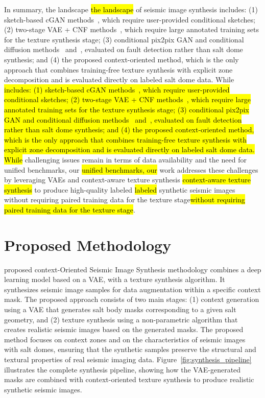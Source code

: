 \documentclass{ieeeaccess}
\makeatletter
\DeclareRobustCommand{\DIFaddbegin}{\DIFOaddbegin \let\includegraphics\DIFaddincludegraphics} %
\DeclareRobustCommand{\DIFaddend}{\DIFOaddend \let\includegraphics\DIFOincludegraphics} %
\DeclareRobustCommand{\DIFdelbegin}{\DIFOdelbegin \let\includegraphics\DIFdelincludegraphics} %
\DeclareRobustCommand{\DIFdelend}{\DIFOaddend \let\includegraphics\DIFOincludegraphics} %
\let\sout@orig\sout %
\renewcommand{\sout}[1]{\ifmmode\text{\sout@orig{\ensuremath{#1}}}\else\sout@orig{#1}\fi} %
\providecommand{\DIFadd}[1]{{\protect\color{blue}#1}}
\providecommand{\DIFdel}[1]{{\protect\color{red}\sout{#1}}}
\renewcommand{\DIFadd}[1]{\ifmmode#1\else\begingroup\let\protect\relax\hl{#1}\endgroup\fi}
\renewcommand{\DIFdel}[1]{}
\providecommand{\DIFaddbegin}{}
\providecommand{\DIFaddend}{}
\providecommand{\DIFdelbegin}{}
\providecommand{\DIFdelend}{}
\renewcommand{\DIFaddbegin}{}
\renewcommand{\DIFaddend}{}
\renewcommand{\DIFdelbegin}{}
\renewcommand{\DIFdelend}{}
\makeatother
\begin{document}
In summary, \DIFdelbegin \DIFdel{while there has been significant progress in the field }\DIFdelend \DIFaddbegin \DIFadd{the landscape }\DIFaddend of seismic image synthesis \DIFdelbegin \DIFdel{, some }\DIFdelend \DIFaddbegin \DIFadd{includes: (1) sketch-based cGAN methods~\cite{Ferreira2020}, which require user-provided conditional sketches; (2) two-stage VAE + CNF methods~\cite{Henriques2021}, which require large annotated training sets for the texture synthesis stage; (3) conditional pix2pix GAN and conditional diffusion methods~\cite{Choi2021} and~\cite{Choi2025}, evaluated on fault detection rather than salt dome synthesis; and (4) the proposed context-oriented method, which is the only approach that combines training-free texture synthesis with explicit zone decomposition and is evaluated directly on labeled salt dome data. While }\DIFaddend challenging issues remain \DIFdelbegin \DIFdel{open }\DIFdelend in terms of data availability \DIFdelbegin \DIFdel{, evaluation methodologies, }\DIFdelend and the need for \DIFdelbegin \DIFdel{more robust generative models. Our }\DIFdelend \DIFaddbegin \DIFadd{unified benchmarks, our }\DIFaddend work addresses these challenges by leveraging VAEs and \DIFdelbegin \DIFdel{advanced texture synthesis techniques }\DIFdelend \DIFaddbegin \DIFadd{context-aware texture synthesis }\DIFaddend to produce high-quality \DIFaddbegin \DIFadd{labeled }\DIFaddend synthetic seismic images \DIFaddbegin \DIFadd{without requiring paired training data for the texture stage}\DIFaddend .



\section{Proposed Methodology}
\label{sec:methodology}


 proposed context-Oriented Seismic Image Synthesis methodology combines a deep learning model based on a VAE, with a texture synthesis algorithm. It synthesizes seismic image samples for data augmentation within a specific context mask. The proposed approach consists of two main stages: (1) context generation using a VAE that generates salt body masks corresponding to a given salt geometry, and (2) texture synthesis using a non-parametric algorithm that creates realistic seismic images based on the generated masks. The proposed method focuses on context zones and on the characteristics of seismic images with salt domes, ensuring that the synthetic samples preserve the structural and textural properties of real seismic imaging data. Figure~\ref{fig:synthesis_pipeline} illustrates the complete synthesis pipeline, showing how the VAE-generated masks are combined with context-oriented texture synthesis to produce realistic synthetic seismic images.
\end{document}
